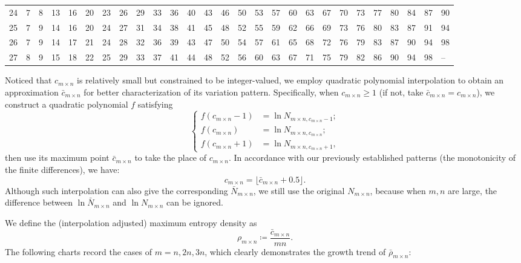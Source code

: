 \documentclass[11pt]{article}
\begin{document}
\begin{center}
\begin{tabular}{r|l}
            24 & 7~~\phantom{0}8~~13~~16~~20~~23~~26~~29~~33~~36~~40~~43~~46~~50~~53~~57~~60~~63~~67~~70~~73~~77~~80~~84~~87~~90 \\
            25 & 7~~\phantom{0}9~~14~~16~~20~~24~~27~~31~~34~~38~~41~~45~~48~~52~~55~~59~~62~~66~~69~~73~~76~~80~~83~~87~~91~~94 \\
            26 & 7~~\phantom{0}9~~14~~17~~21~~24~~28~~32~~36~~39~~43~~47~~50~~54~~57~~61~~65~~68~~72~~76~~79~~83~~87~~90~~94~~98 \\
            27 & 8~~\phantom{0}9~~15~~18~~22~~25~~29~~33~~37~~41~~44~~48~~52~~56~~60~~63~~67~~71~~75~~79~~82~~86~~90~~94~~98~~-- \\
            \hline
        \end{tabular}
        \normalsize
    \end{center}

    Noticed that $c_{m\times n}$ is relatively small but constrained to be integer-valued, we employ quadratic polynomial interpolation to obtain an approximation $\bar{c}_{m\times n}$ for better characterization of its variation pattern.
    Specifically, when $c_{m\times n}\geq 1$ (if not, take $\bar{c}_{m\times n}=c_{m\times n}$), we construct a quadratic polynomial $f$ satisfying
    \[
        \begin{cases}
            f(c_{m\times n}-1) &= \ln N_{m\times n,c_{m\times n}-1};\\
            f(c_{m\times n})   &= \ln N_{m\times n, c_{m\times n}};\\
            f(c_{m\times n}+1) &= \ln N_{m\times n,c_{m\times n}+1},
        \end{cases}
    \]
    then use its maximum point $\bar{c}_{m\times n}$ to take the place of $c_{m\times n}$.
    In accordance with our previously established patterns (the monotonicity of the finite differences), we have:
    \[
        c_{m\times n}=\lfloor \bar{c}_{m\times n}+ 0.5 \rfloor.
    \]
    Although such interpolation can also give the corresponding $\bar{N}_{m\times n}$, we still use the original $N_{m\times n}$,
    because when $m, n$ are large, the difference between $\ln\bar{N}_{m\times n}$ and $\ln N_{m\times n}$ can be ignored.

    We define the (interpolation adjusted) maximum entropy density as
    \[
        \rho_{m\times n}\coloneq\frac{\bar{c}_{m\times n}}{mn}.
    \]
    The following charts record the cases of $m=n, 2n,3n$, which clearly demonstrates the growth trend of $\bar{\rho}_{m\times n}$:
\end{document}
